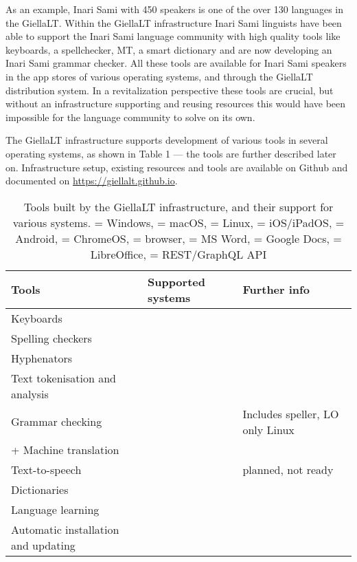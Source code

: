 \documentclass[free]{flammie}
\begin{document}
As an example, Inari Sami with 450 speakers is one of the over 130 languages in
the GiellaLT\@. Within the GiellaLT infrastructure Inari Sami linguists have been
able to support the Inari Sami language community with high quality tools like
keyboards, a spellchecker, MT, a smart dictionary and are now developing an
Inari Sami grammar checker. All these tools are available for Inari Sami
speakers in the app stores of various operating systems, and through the
GiellaLT distribution system. In a revitalization perspective these tools are
crucial, but without an infrastructure supporting and reusing resources this
would have been impossible for the language community to solve on its own.

The GiellaLT infrastructure supports development of various tools in several operating
systems, as shown in Table 1 — the tools are further described later on. Infrastructure setup,
existing resources and tools are available on Github and documented on
\url{https://giellalt.github.io}.

\begin{table}
    \caption{
Tools built by the GiellaLT infrastructure, and their support for various systems.
= Windows, = macOS, = Linux, = iOS/iPadOS,
= Android, = ChromeOS, = browser,
= MS Word, = Google Docs, = LibreOffice, = REST/GraphQL API\label{tbl:}}
    \begin{tabular}{lll}
    Tools & Supported systems & Further info \\
        \hline
Keyboards \\
Spelling checkers \\
Hyphenators \\
Text tokenisation and analysis \\
        Grammar checking & & Includes speller, LO only Linux \\+
Machine translation\\
Text-to-speech & & planned, not ready\\
Dictionaries \\
Language learning \\
Automatic installation and updating & & \\
    \end{tabular}
\end{table}
\end{document}

